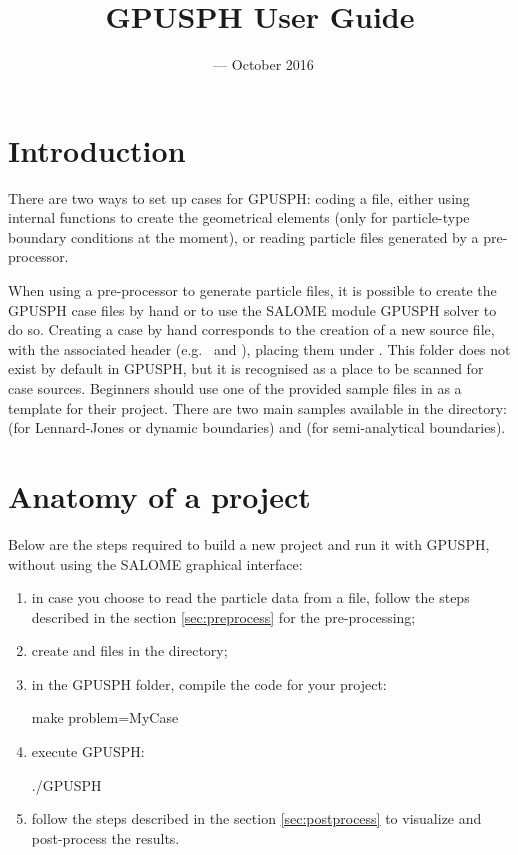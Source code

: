 \documentclass{../GPUSPHtemplate}
\title{GPUSPH User Guide}
\author{}
\date{\currentver\ --- October 2016}
\begin{document}
\maketitle
\tableofcontents
\newpage
\section{Introduction}

There are two ways to set up cases for GPUSPH: coding a  file, either using internal functions
to create the geometrical elements (only for particle-type boundary conditions at the moment),
or reading particle files generated by a pre-processor.

When using a pre-processor to generate particle files, it is possible to create the
GPUSPH case files by hand or to use the SALOME module GPUSPH solver to do so.
Creating a case by hand corresponds to the creation of a new \cu source file, with
the associated header (e.g.\  and ),
placing them under . This folder does not exist by default in GPUSPH,
but it is recognised as a place to be scanned for case sources.
Beginners should use one of the provided sample files in  
as a template for their project.
There are two main samples available in the  directory: 
 (for Lennard-Jones or dynamic boundaries) 
and  (for semi-analytical boundaries).\\

\section{Anatomy of a project}

Below are the steps required to build a new project and run it with GPUSPH, without
using the SALOME graphical interface:
\begin{enumerate}
\item in case you choose to read the particle data from a file, follow the steps 
described in the section \ref{sec:preprocess} for the pre-processing;
\item create  and  files in 
the  directory;
\item in the GPUSPH folder, compile the code for your project:
\begin{shellcode}
make problem=MyCase
\end{shellcode}
\item execute GPUSPH:
\begin{shellcode}
./GPUSPH
\end{shellcode}
\item follow the steps described in the section \ref{sec:postprocess} 
to visualize and post-process the results.
\end{enumerate}
\end{document}
